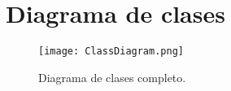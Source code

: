 

\chapter{Diagrama de clases}
\label{chap:diagramaclases}

\begin{landscape}
\begin{figure}[!h]
\begin{center}
\texttt{[image: ClassDiagram.png]}
\caption{Diagrama de clases completo.}
\label{fig:classdiagramcompleto}
\end{center}
\end{figure}
\end{landscape}
